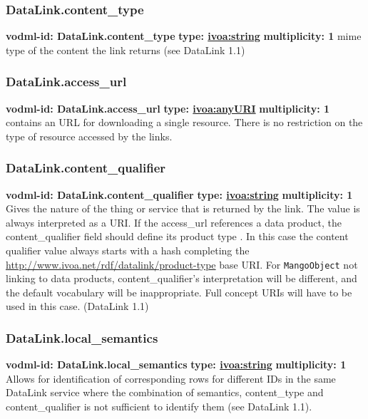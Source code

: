     \subsubsection{DataLink.content\_type}
      \textbf{vodml-id: DataLink.content\_type} \newline
      \textbf{type: \hyperref[sect:ivoa]{ivoa:string}} \newline
      \textbf{multiplicity: 1} \newline
      mime type of the content the link returns (see DataLink 1.1)

    \subsubsection{DataLink.access\_url}
      \textbf{vodml-id: DataLink.access\_url} \newline
      \textbf{type: \hyperref[sect:ivoa]{ivoa:anyURI}} \newline
      \textbf{multiplicity: 1} \newline
      contains an URL for downloading a single resource. There is no restriction on the type of resource accessed by the links.

    \subsubsection{DataLink.content\_qualifier}
      \textbf{vodml-id: DataLink.content\_qualifier} \newline
      \textbf{type: \hyperref[sect:ivoa]{ivoa:string}} \newline
      \textbf{multiplicity: 1} \newline
      Gives the nature of the thing or service that is returned by the link. The value is always interpreted as a URI. If the access\_url references a data product, the content\_qualifier field should define its product type . In this case the content qualifier value always starts with a hash completing the \url{http://www.ivoa.net/rdf/datalink/product-type} base URI. For \texttt{MangoObject} not linking to data products, content\_qualifier’s interpretation will be different, and the default vocabulary will be inappropriate. Full concept URIs will have to be used in this case. (DataLink 1.1)

    \subsubsection{DataLink.local\_semantics}
      \textbf{vodml-id: DataLink.local\_semantics} \newline
      \textbf{type: \hyperref[sect:ivoa]{ivoa:string}} \newline
      \textbf{multiplicity: 1} \newline
      Allows for identification of corresponding rows for different IDs in the same DataLink service where the combination of semantics, content\_type and content\_qualifier is not sufficient to identify them (see DataLink 1.1).

